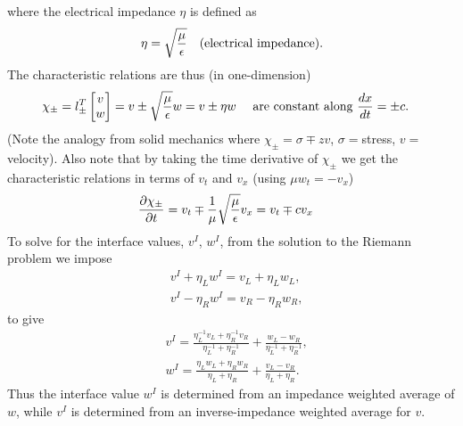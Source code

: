 where the electrical impedance $\eta$ is defined as 
\begin{align*}
  \eta = \sqrt{\frac{\mu}{\epsilon}} \quad \text{(electrical impedance)}. 
\end{align*}
The characteristic relations are thus (in one-dimension)
\begin{align*}
&  \chi_{\pm} = l_\pm^T \begin{bmatrix} v \\ w \end{bmatrix} = 
v \pm \sqrt{\frac{\mu}{\epsilon}} w =  v \pm \eta w \quad \text{ are constant along $\frac{dx}{dt}=\pm c$}. 
\end{align*}
(Note the analogy from solid mechanics where $\chi_{\pm} = \sigma \mp z v$, $\sigma=$stress, $v=$velocity).
Also note that by taking the time derivative of $\chi_\pm$ we get the characteristic relations in terms of
$v_t$ and $v_x$ (using $\mu w_t=-v_x$)
\begin{align*}
&  \frac{\partial\chi_{\pm}}{\partial t}  =  v_t   \mp \frac{1}{\mu}\sqrt{\frac{\mu}{\epsilon}} v_x
 =  v_t \mp c v_x 
\end{align*}
To solve for the interface values, $v^{I}$, $w^{I}$,
from the solution to the Riemann problem we impose
\begin{align*}
&  v^{I} +  \eta_L w^{I} = v_L  + \eta_L w_L, \\
&  v^{I} -  \eta_R w^{I} = v_R  - \eta_R w_R,
\end{align*}
to give 
\begin{align*}
 &  v^{I} = \frac{ \eta_L^{-1} v_L + \eta_R^{-1} v_R}{\eta_L^{-1} + \eta_R^{-1}} + \frac{ w_L - w_R}{\eta_L^{-1} + \eta_R^{-1}}, \\ 
 &  w^{I} = \frac{ \eta_L w_L + \eta_R w_R}{\eta_L + \eta_R} + \frac{ v_L - v_R}{\eta_L + \eta_R} .
\end{align*}
Thus the interface value $w^{I}$ is determined from an impedance weighted average of $w$,
while $v^{I}$ is determined from an inverse-impedance weighted average for $v$.


